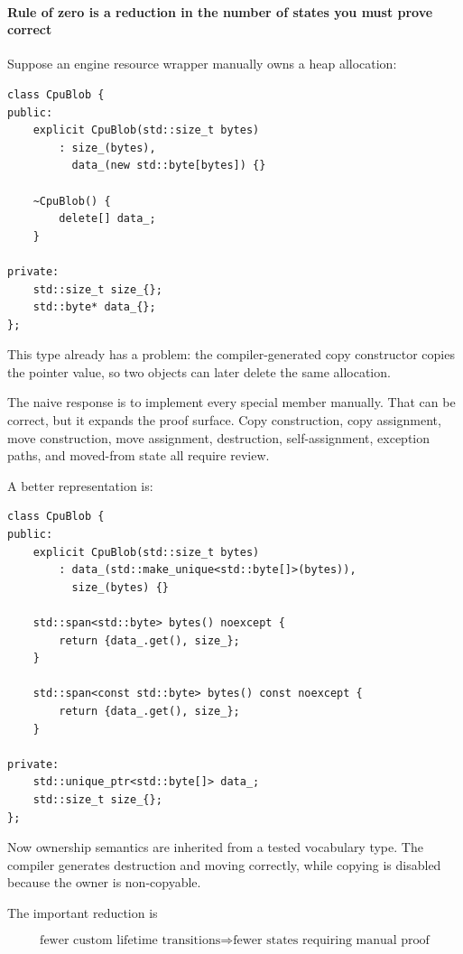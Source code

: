 \paragraph{Rule of zero is a reduction in the number of states you must prove correct}\label{rule-of-zero-is-a-reduction-in-the-number-of-states-you-must-prove-correct}

Suppose an engine resource wrapper manually owns a heap allocation:

\begin{verbatim}
class CpuBlob {
public:
    explicit CpuBlob(std::size_t bytes)
        : size_(bytes),
          data_(new std::byte[bytes]) {}

    ~CpuBlob() {
        delete[] data_;
    }

private:
    std::size_t size_{};
    std::byte* data_{};
};
\end{verbatim}

This type already has a problem: the compiler-generated copy constructor copies the pointer value, so two objects can later delete the same allocation.

The naive response is to implement every special member manually. That can be correct, but it expands the proof surface. Copy construction, copy assignment, move construction, move assignment, destruction, self-assignment, exception paths, and moved-from state all require review.

A better representation is:

\begin{verbatim}
class CpuBlob {
public:
    explicit CpuBlob(std::size_t bytes)
        : data_(std::make_unique<std::byte[]>(bytes)),
          size_(bytes) {}

    std::span<std::byte> bytes() noexcept {
        return {data_.get(), size_};
    }

    std::span<const std::byte> bytes() const noexcept {
        return {data_.get(), size_};
    }

private:
    std::unique_ptr<std::byte[]> data_;
    std::size_t size_{};
};
\end{verbatim}

Now ownership semantics are inherited from a tested vocabulary type. The compiler generates destruction and moving correctly, while copying is disabled because the owner is non-copyable.

The important reduction is

\[
\boxed{
\text{fewer custom lifetime transitions}
\Rightarrow
\text{fewer states requiring manual proof}
}
\]

